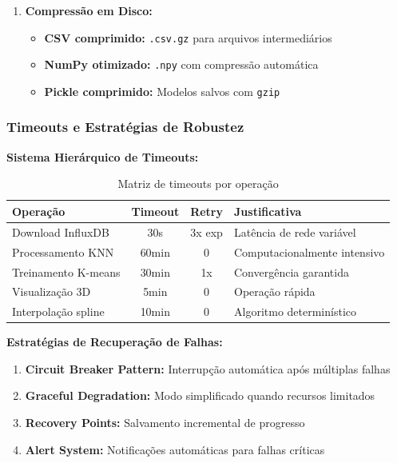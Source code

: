 \begin{enumerate}
    \item \textbf{Compressão em Disco:}
    \begin{itemize}
        \item \textbf{CSV comprimido:} \texttt{.csv.gz} para arquivos intermediários
        \item \textbf{NumPy otimizado:} \texttt{.npy} com compressão automática
        \item \textbf{Pickle comprimido:} Modelos salvos com \texttt{gzip}
    \end{itemize}
\end{enumerate}

\subsubsection{Timeouts e Estratégias de Robustez}

\textbf{Sistema Hierárquico de Timeouts:}

\begin{table}[H]
\centering
\caption{Matriz de timeouts por operação}
\begin{tabular}{|l|c|c|l|}
\hline
\textbf{Operação} & \textbf{Timeout} & \textbf{Retry} & \textbf{Justificativa} \\
\hline
Download InfluxDB & 30s & 3x exp & Latência de rede variável \\
Processamento KNN & 60min & 0 & Computacionalmente intensivo \\
Treinamento K-means & 30min & 1x & Convergência garantida \\
Visualização 3D & 5min & 0 & Operação rápida \\
Interpolação spline & 10min & 0 & Algoritmo determinístico \\
\hline
\end{tabular}
\end{table}

\textbf{Estratégias de Recuperação de Falhas:}

\begin{enumerate}
    \item \textbf{Circuit Breaker Pattern:} Interrupção automática após múltiplas falhas
    \item \textbf{Graceful Degradation:} Modo simplificado quando recursos limitados
    \item \textbf{Recovery Points:} Salvamento incremental de progresso
    \item \textbf{Alert System:} Notificações automáticas para falhas críticas
\end{enumerate}

